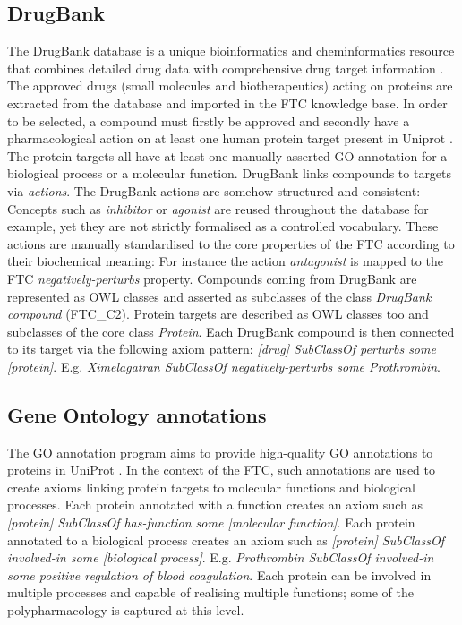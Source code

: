 \documentclass{bioinfo}
\begin{document}
\subsection{DrugBank}
The DrugBank database is a unique bioinformatics and cheminformatics resource 
that combines detailed drug data with comprehensive drug target information \citep{Knox2011}. The approved 
drugs (small molecules and biotherapeutics) acting on proteins are extracted from the database and 
imported in the FTC knowledge base. In order to be selected, a compound must firstly be approved and 
secondly have a pharmacological action on at least one human protein target present in Uniprot \citep{TheUniprotConsortium2013}. 
The protein targets all have at least one manually asserted GO annotation \citep{Dimmer2012} for a biological process or a 
molecular function. DrugBank links compounds to targets via \emph{actions}. The DrugBank actions are somehow 
structured and consistent: Concepts such as \emph{inhibitor} or \emph{agonist} are reused throughout the database for 
example, yet they are not strictly formalised as a controlled vocabulary. These actions are manually 
standardised to the core properties of the FTC according to their biochemical meaning: For instance the action 
\emph{antagonist} is mapped to the FTC \emph{negatively-perturbs} property.
Compounds coming from DrugBank are represented as OWL classes and asserted 
as subclasses of the class \emph{DrugBank compound} (FTC\_C2). Protein targets are described as OWL classes 
too and subclasses of the core class \emph{Protein}. Each DrugBank compound is then connected to 
its target via the following axiom pattern: \emph{[drug] SubClassOf perturbs some [protein]}. 
E.g. \emph{Ximelagatran SubClassOf negatively-perturbs some Prothrombin}.

\subsection{Gene Ontology annotations}
The GO annotation program aims to provide high-quality GO annotations to 
proteins in UniProt \citep{Dimmer2012}. In the context of the FTC, such annotations are used 
to create axioms linking protein targets to molecular functions and biological processes. 
Each protein annotated with a function creates an axiom such 
as \emph{[protein] SubClassOf has-function some [molecular function]}. 
Each protein annotated to a biological process creates an axiom such 
as \emph{[protein] SubClassOf involved-in some [biological process]}. 
E.g. \emph{Prothrombin SubClassOf involved-in some positive regulation of blood coagulation}. 
Each protein can be involved in multiple processes and capable of realising multiple functions;
some of the polypharmacology is captured at this level.
\end{document}
